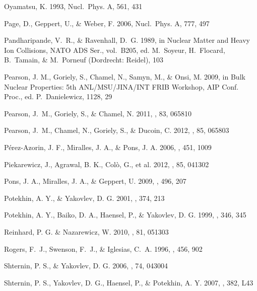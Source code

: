 \documentclass{aa}
\begin{document}
\begin{thebibliography}{}
Oyamatsu, K.
1993,
Nucl.~Phys. A, 561, 431

Page, D., Geppert, U., \& Weber, F.
2006,
Nucl.~Phys. A, 777, 497

Pandharipande, V.~R., \& Ravenhall, D.~G. 
1989,
in Nuclear Matter and Heavy Ion Collisions,
NATO ADS Ser., vol.~B205, 
ed. M.~Soyeur, H.~Flocard, B.~Tamain, \& M.~Porneuf
(Dordrecht: Reidel), 103

Pearson, J. M., Goriely, S., Chamel, N., Samyn, M., \& Onsi, M.
2009, in
Bulk Nuclear Properties: 5th ANL/MSU/JINA/INT FRIB Workshop,
AIP Conf. Proc.,
ed. P.~Danielewicz,
1128, 29

Pearson, J.~M., Goriely, S., \& Chamel, N.
2011,
\prc, 83, 065810

Pearson, J.~M., Chamel, N., Goriely, S., \& Ducoin, C.
2012,
\prc, 85, 065803

P\'erez-Azorin, J. F., Miralles, J. A., \& Pons, J. A.
2006,
\aap, 451, 1009

Piekarewicz, J., Agrawal, B. K., Col{\`o}, G., et al. 
2012,
\prc, 85, 041302 

Pons, J. A.,  Miralles, J. A., \& Geppert, U.
2009,
\aap, 496, 207

Potekhin, A. Y., \& Yakovlev, D. G.
2001,
\aap, 374, 213

Potekhin, A. Y., Baiko, D. A., Haensel, P., \& Yakovlev, D. G.
1999,
\aap, 346, 345

Reinhard, P. G. \& Nazarewicz, W.
2010,
\prc, 81, 051303 

Rogers, F.~J., Swenson, F.~J., \& Iglesias, C.~A.
1996,
\apj, 456, 902

Shternin, P. S., \& Yakovlev, D. G.
2006,
\prd, 74, 043004

Shternin, P. S., Yakovlev, D. G., Haensel, P., \& Potekhin, A. Y.
2007,
\mnras, 382, L43


\end{thebibliography}
\end{document}
